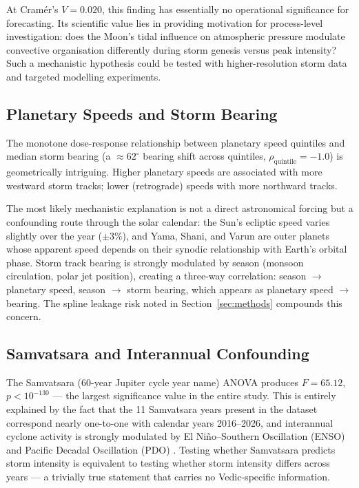 \documentclass[12pt,a4paper]{article}
\begin{document}
At Cram\'er's $V = 0.020$, this finding has essentially no operational
significance for forecasting.
Its scientific value lies in providing motivation for process-level investigation:
does the Moon's tidal influence on atmospheric pressure modulate convective
organisation differently during storm genesis versus peak intensity?
Such a mechanistic hypothesis could be tested with higher-resolution storm data
and targeted modelling experiments.

\subsection{Planetary Speeds and Storm Bearing}

The monotone dose-response relationship between planetary speed quintiles
and median storm bearing (a $\approx 62^\circ$ bearing shift across quintiles,
$\rho_\text{quintile} = -1.0$) is geometrically intriguing.
Higher planetary speeds are associated with more westward storm tracks; lower
(retrograde) speeds with more northward tracks.

The most likely mechanistic explanation is not a direct astronomical forcing
but a confounding route through the solar calendar: the Sun's ecliptic speed
varies slightly over the year ($\pm 3\%$), and Yama, Shani, and Varun are
outer planets whose apparent speed depends on their synodic relationship with
Earth's orbital phase.
Storm track bearing is strongly modulated by season (monsoon circulation,
polar jet position), creating a three-way correlation: season $\to$
planetary speed, season $\to$ storm bearing, which appears as planetary
speed $\to$ bearing.
The spline leakage risk noted in Section~\ref{sec:methods} compounds this concern.

\subsection{Samvatsara and Interannual Confounding}

The Samvatsara (60-year Jupiter cycle year name) ANOVA produces $F = 65.12$,
$p < 10^{-130}$ — the largest significance value in the entire study.
This is entirely explained by the fact that the 11 Samvatsara years present
in the dataset correspond nearly one-to-one with calendar years 2016--2026,
and interannual cyclone activity is strongly modulated by El Ni\~no--Southern
Oscillation (ENSO) and Pacific Decadal Oscillation (PDO) \citep{gray1984atlantic}.
Testing whether Samvatsara predicts storm intensity is equivalent to testing
whether storm intensity differs across years — a trivially true statement that
carries no Vedic-specific information.
\end{document}
